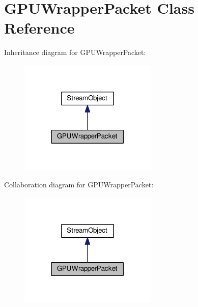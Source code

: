 \hypertarget{class_g_p_u_wrapper_packet}{}\section{G\+P\+U\+Wrapper\+Packet Class Reference}
\label{class_g_p_u_wrapper_packet}


Inheritance diagram for G\+P\+U\+Wrapper\+Packet\+:\nopagebreak
\begin{figure}[H]
\begin{center}
\leavevmode
\includegraphics[width=186pt]{class_g_p_u_wrapper_packet__inherit__graph}
\end{center}
\end{figure}


Collaboration diagram for G\+P\+U\+Wrapper\+Packet\+:\nopagebreak
\begin{figure}[H]
\begin{center}
\leavevmode
\includegraphics[width=186pt]{class_g_p_u_wrapper_packet__coll__graph}
\end{center}
\end{figure}
